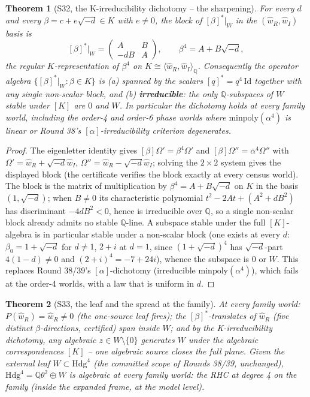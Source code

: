 \documentclass[11pt]{article}
\newtheorem{theorem}{Theorem}[section]
\begin{document}
\begin{theorem}[S32, the K-irreducibility dichotomy -- the
sharpening]\label{thm:s32}
For every $d$ and every $\beta = c + e\sqrt{-d} \in K$ with
$e \neq 0$, the block of $[\beta]^*|_W$ in the $(\hat w_R, \hat w_I)$
basis is
\[
[\beta]^*|_W = \begin{pmatrix} A & B \\ -dB & A \end{pmatrix},
\qquad \beta^4 = A + B\sqrt{-d},
\]
the regular $K$-representation of $\beta^4$ on $K \cong
\langle \hat w_R, \hat w_I\rangle_\mathbb{Q}$. Consequently the operator
algebra $\{[\beta]^*|_W : \beta \in K\}$ is (a) spanned by the scalars
$[q]^* = q^4\,\mathrm{Id}$ together with any single non-scalar block, and
(b) \textbf{irreducible}: the only $\mathbb{Q}$-subspaces of $W$ stable
under $[K]$ are $0$ and $W$. In particular the dichotomy holds at
\emph{every} family world, including the order-4 and order-6 phase worlds
where $\mathrm{minpoly}(\alpha^4)$ is linear or Round 38's
$[\alpha]$-irreducibility criterion degenerates.
\end{theorem}

\begin{proof}
The eigenletter identity gives $[\beta]\Omega' = \beta^4\Omega'$ and
$[\beta]\Omega'' = \bar\alpha^4\Omega''$ with
$\Omega' = \hat w_R + \sqrt{-d}\hat w_I$,
$\Omega'' = \hat w_R - \sqrt{-d}\hat w_I$; solving the $2\times 2$ system
gives the displayed block (the certificate verifies the block exactly at
every census world). The block is the matrix of multiplication by
$\beta^4 = A + B\sqrt{-d}$ on $K$ in the basis $(1, \sqrt{-d})$; when
$B \neq 0$ its characteristic polynomial
$t^2 - 2At + (A^2 + dB^2)$ has discriminant $-4dB^2 < 0$, hence is
irreducible over $\mathbb{Q}$, so a single non-scalar block already
admits no stable $\mathbb{Q}$-line. A subspace stable under the full
$[K]$-algebra is in particular stable under a non-scalar block (one
exists at every $d$: $\beta_0 = 1+\sqrt{-d}$ for $d \neq 1$, $2+i$ at
$d = 1$, since $(1+\sqrt{-d})^4$ has $\sqrt{-d}$-part $4(1-d) \neq 0$ and
$(2+i)^4 = -7+24i$), whence the subspace is $0$ or $W$. This replaces
Round 38/39's $[\alpha]$-dichotomy (irreducible $\mathrm{minpoly}(\alpha^4)$),
which fails at the order-4 worlds, with a law that is uniform in $d$.
\end{proof}

\begin{theorem}[S33, the leaf and the spread at the family]\label{thm:s33}
At every family world: $P(\hat w_R) = \hat w_R \neq 0$ (the one-source
leaf fires); the $[\beta]^*$-translates of $\hat w_R$ (five distinct
$\beta$-directions, certified) span inside $W$; and by the
K-irreducibility dichotomy, any algebraic $z \in W \setminus \{0\}$
generates $W$ under the algebraic correspondences $[K]$ -- one algebraic
source closes the full plane. Given the external leaf
$W \subset \mathrm{Hdg}^4$ (the committed scope of Rounds 38/39,
unchanged), $\mathrm{Hdg}^4 = \mathbb{Q}\theta^2 \oplus W$ is algebraic
at every family world: the RHC at degree 4 on the family (inside the
expanded frame, at the model level).
\end{theorem}
\end{document}
